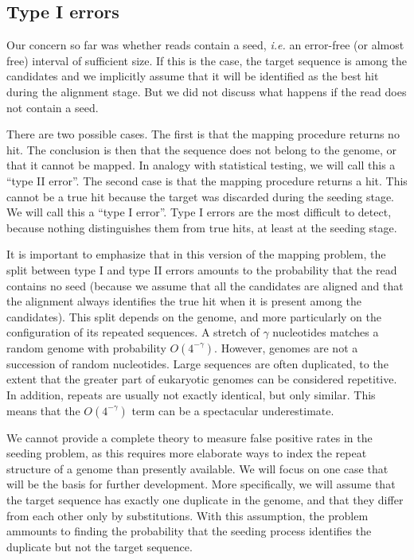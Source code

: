 \documentclass{article}
\begin{document}
\subsection{Type I errors}
\label{sec:fp}


Our concern so far was whether reads contain a seed, \textit{i.e.} an
error-free (or almost free) interval of sufficient size. If this is the
case, the target sequence is among the candidates and we implicitly assume
that it will be identified as the best hit during the alignment stage.
But we did not discuss what happens if the read does not contain a seed.

There are two possible cases. The first is that the mapping procedure
returns no hit. The conclusion is then that the sequence does not belong
to the genome, or that it cannot be mapped. In analogy with statistical
testing, we will call this a ``type II error''. The second case is that
the mapping procedure returns a hit. This cannot be a true hit because the
target was discarded during the seeding stage. We will call this a ``type
I error''. Type I errors are the most difficult to detect, because nothing
distinguishes them from true hits, at least at the seeding stage.

It is important to emphasize that in this version of the mapping problem,
the split between type I and type II errors amounts to the probability
that the read contains no seed (because we assume that all the candidates
are aligned and that the alignment always identifies the true hit when it
is present among the candidates). This split depends on the genome, and
more particularly on the configuration of its repeated sequences. A
stretch of  $\gamma$ nucleotides matches a random genome with probability
$O(4^{-\gamma})$. However, genomes are not a succession of random
nucleotides. Large sequences are often duplicated, to the extent that the
greater part of eukaryotic genomes can be considered repetitive. In
addition, repeats are usually not exactly identical, but only similar.
This means that the $O(4^{-\gamma})$ term can be a spectacular
underestimate.

We cannot provide a complete theory to measure false positive rates in the
seeding problem, as this requires more elaborate ways to index the repeat
structure of a genome than presently available. We will focus on one case
that will be the basis for further development. More specifically, we will
assume that the target sequence has exactly one duplicate in the genome,
and that they differ from each other only by substitutions. With this
assumption, the problem ammounts to finding the probability that the
seeding process identifies the duplicate but not the target sequence.
\end{document}
